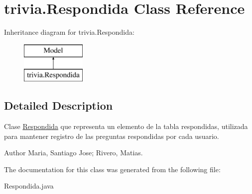 \hypertarget{classtrivia_1_1Respondida}{}\section{trivia.\+Respondida Class Reference}
\label{classtrivia_1_1Respondida}
Inheritance diagram for trivia.\+Respondida\+:\begin{figure}[H]
\begin{center}
\leavevmode
\includegraphics[height=2.000000cm]{classtrivia_1_1Respondida}
\end{center}
\end{figure}


\subsection{Detailed Description}
Clase \mbox{\hyperlink{classtrivia_1_1Respondida}{Respondida}} que representa un elemento de la tabla respondidas, utilizada para mantener registro de las preguntas respondidas por cada usuario. \begin{DoxyAuthor}{Author}
Maria, Santiago Jose; Rivero, Matias. 
\end{DoxyAuthor}


The documentation for this class was generated from the following file\+:\begin{DoxyCompactItemize}
\item 
Respondida.\+java\end{DoxyCompactItemize}
